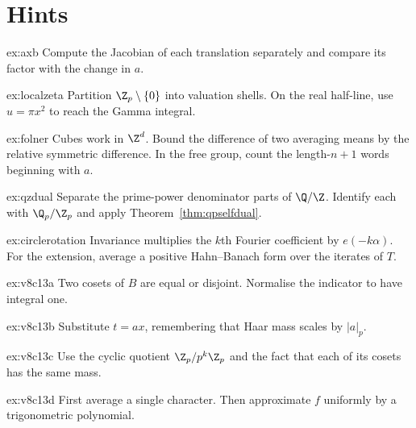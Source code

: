 \section{Hints}
\begin{hint}{ex:axb}
Compute the Jacobian of each translation separately and compare its factor with the change in $a$.
\end{hint}
\begin{hint}{ex:localzeta}
Partition $\Z_p\setminus\{0\}$ into valuation shells. On the real half-line, use $u=\pi x^2$ to reach the Gamma integral.
\end{hint}
\begin{hint}{ex:folner}
Cubes work in $\Z^d$. Bound the difference of two averaging means by the relative symmetric difference. In the free group, count the length-$n+1$ words beginning with $a$.
\end{hint}
\begin{hint}{ex:qzdual}
Separate the prime-power denominator parts of $\Q/\Z$. Identify each with $\Q_p/\Z_p$ and apply Theorem~\ref{thm:qpselfdual}.
\end{hint}
\begin{hint}{ex:circlerotation}
Invariance multiplies the $k$th Fourier coefficient by $e(-k\alpha)$. For the extension, average a positive Hahn--Banach form over the iterates of $T$.
\end{hint}
\begin{hint}{ex:v8c13a}
Two cosets of $B$ are equal or disjoint. Normalise the indicator to have integral one.
\end{hint}
\begin{hint}{ex:v8c13b}
Substitute $t=ax$, remembering that Haar mass scales by $|a|_p$.
\end{hint}
\begin{hint}{ex:v8c13c}
Use the cyclic quotient $\Z_p/p^k\Z_p$ and the fact that each of its cosets has the same mass.
\end{hint}
\begin{hint}{ex:v8c13d}
First average a single character. Then approximate $f$ uniformly by a trigonometric polynomial.
\end{hint}

